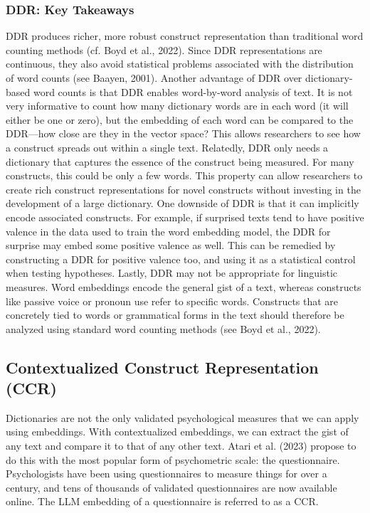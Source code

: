 \documentclass[
  man,
  floatsintext,
  longtable,
  nolmodern,
  notxfonts,
  notimes,
  colorlinks=true,linkcolor=blue,citecolor=blue,urlcolor=blue]{apa7}
\begin{document}
\subsubsection{DDR: Key Takeaways}\label{ddr-key-takeaways}

DDR produces richer, more robust construct representation than
traditional word counting methods (cf. Boyd et al., 2022). Since DDR
representations are continuous, they also avoid statistical problems
associated with the distribution of word counts (see Baayen, 2001).
Another advantage of DDR over dictionary-based word counts is that DDR
enables word-by-word analysis of text. It is not very informative to
count how many dictionary words are in each word (it will either be one
or zero), but the embedding of each word can be compared to the
DDR---how close are they in the vector space? This allows researchers to
see how a construct spreads out within a single text. Relatedly, DDR
only needs a dictionary that captures the essence of the construct being
measured. For many constructs, this could be only a few words. This
property can allow researchers to create rich construct representations
for novel constructs without investing in the development of a large
dictionary. One downside of DDR is that it can implicitly encode
associated constructs. For example, if surprised texts tend to have
positive valence in the data used to train the word embedding model, the
DDR for surprise may embed some positive valence as well. This can be
remedied by constructing a DDR for positive valence too, and using it as
a statistical control when testing hypotheses. Lastly, DDR may not be
appropriate for linguistic measures. Word embeddings encode the general
gist of a text, whereas constructs like passive voice or pronoun use
refer to specific words. Constructs that are concretely tied to words or
grammatical forms in the text should therefore be analyzed using
standard word counting methods (see Boyd et al., 2022).

\subsection{Contextualized Construct Representation
(CCR)}\label{contextualized-construct-representation-ccr}

Dictionaries are not the only validated psychological measures that we
can apply using embeddings. With contextualized embeddings, we can
extract the gist of any text and compare it to that of any other text.
Atari et al. (2023) propose to do this with the most popular form of
psychometric scale: the questionnaire. Psychologists have been using
questionnaires to measure things for over a century, and tens of
thousands of validated questionnaires are now available online. The LLM
embedding of a questionnaire is referred to as a CCR.
\end{document}
